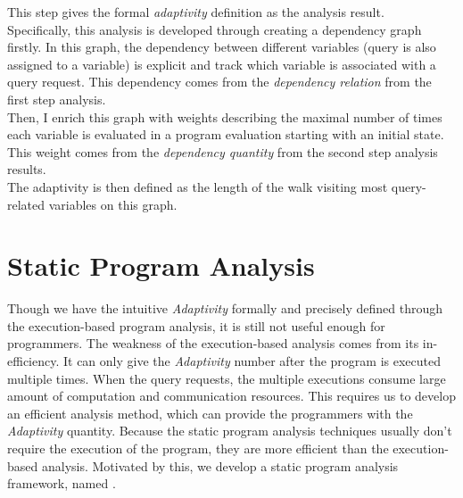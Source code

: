 \begin{enumerate}
   This step 
  gives the formal \emph{adaptivity} definition as the analysis result. 
  \\
  Specifically, this analysis is developed through creating a dependency graph firstly. 
  In this graph, the dependency between different variables (query is also assigned to a variable) 
  is explicit and track which variable is associated with a query request. 
  This dependency comes from the \emph{dependency relation} from the first step analysis.
  \\
 Then, I enrich this graph with 
 weights describing the maximal number of times each variable is evaluated in a program evaluation starting with an initial state. 
 This weight comes from the \emph{dependency quantity} from the second step analysis results.
 \\
  The adaptivity is then defined as the length of the walk visiting most query-related variables on this graph. 
      \end{enumerate}
\section{Static Program Analysis}
\label{sec:intro-static}
%
Though we have the intuitive \emph{Adaptivity} formally and precisely defined through the execution-based program analysis,
it is still not useful enough for programmers.
The weakness of the execution-based analysis comes from its in-efficiency.
It can only give the \emph{Adaptivity} number
after the program is executed multiple times.
When the query requests, the multiple executions consume large amount of computation and communication resources.
This requires us to develop an efficient analysis method, 
which can provide the programmers with the \emph{Adaptivity} quantity.
Because the static program analysis techniques usually don't require the execution of the program,
they are more efficient than the execution-based analysis.
Motivated by this, we develop a static program analysis framework, named {\THESYSTEM}.
